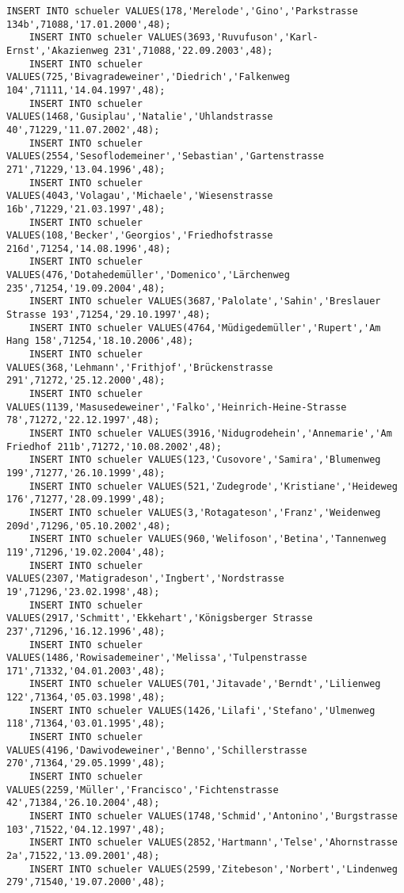 \begin{lstlisting}[breaklines=True, numbers=none, basicstyle=\tiny, keepspaces=false]
	INSERT INTO schueler VALUES(178,'Merelode','Gino','Parkstrasse 134b',71088,'17.01.2000',48);
	INSERT INTO schueler VALUES(3693,'Ruvufuson','Karl-Ernst','Akazienweg 231',71088,'22.09.2003',48);
	INSERT INTO schueler VALUES(725,'Bivagradeweiner','Diedrich','Falkenweg 104',71111,'14.04.1997',48);
	INSERT INTO schueler VALUES(1468,'Gusiplau','Natalie','Uhlandstrasse 40',71229,'11.07.2002',48);
	INSERT INTO schueler VALUES(2554,'Sesoflodemeiner','Sebastian','Gartenstrasse 271',71229,'13.04.1996',48);
	INSERT INTO schueler VALUES(4043,'Volagau','Michaele','Wiesenstrasse 16b',71229,'21.03.1997',48);
	INSERT INTO schueler VALUES(108,'Becker','Georgios','Friedhofstrasse 216d',71254,'14.08.1996',48);
	INSERT INTO schueler VALUES(476,'Dotahedemüller','Domenico','Lärchenweg 235',71254,'19.09.2004',48);
	INSERT INTO schueler VALUES(3687,'Palolate','Sahin','Breslauer Strasse 193',71254,'29.10.1997',48);
	INSERT INTO schueler VALUES(4764,'Müdigedemüller','Rupert','Am Hang 158',71254,'18.10.2006',48);
	INSERT INTO schueler VALUES(368,'Lehmann','Frithjof','Brückenstrasse 291',71272,'25.12.2000',48);
	INSERT INTO schueler VALUES(1139,'Masusedeweiner','Falko','Heinrich-Heine-Strasse 78',71272,'22.12.1997',48);
	INSERT INTO schueler VALUES(3916,'Nidugrodehein','Annemarie','Am Friedhof 211b',71272,'10.08.2002',48);
	INSERT INTO schueler VALUES(123,'Cusovore','Samira','Blumenweg 199',71277,'26.10.1999',48);
	INSERT INTO schueler VALUES(521,'Zudegrode','Kristiane','Heideweg 176',71277,'28.09.1999',48);
	INSERT INTO schueler VALUES(3,'Rotagateson','Franz','Weidenweg 209d',71296,'05.10.2002',48);
	INSERT INTO schueler VALUES(960,'Welifoson','Betina','Tannenweg 119',71296,'19.02.2004',48);
	INSERT INTO schueler VALUES(2307,'Matigradeson','Ingbert','Nordstrasse 19',71296,'23.02.1998',48);
	INSERT INTO schueler VALUES(2917,'Schmitt','Ekkehart','Königsberger Strasse 237',71296,'16.12.1996',48);
	INSERT INTO schueler VALUES(1486,'Rowisademeiner','Melissa','Tulpenstrasse 171',71332,'04.01.2003',48);
	INSERT INTO schueler VALUES(701,'Jitavade','Berndt','Lilienweg 122',71364,'05.03.1998',48);
	INSERT INTO schueler VALUES(1426,'Lilafi','Stefano','Ulmenweg 118',71364,'03.01.1995',48);
	INSERT INTO schueler VALUES(4196,'Dawivodeweiner','Benno','Schillerstrasse 270',71364,'29.05.1999',48);
	INSERT INTO schueler VALUES(2259,'Müller','Francisco','Fichtenstrasse 42',71384,'26.10.2004',48);
	INSERT INTO schueler VALUES(1748,'Schmid','Antonino','Burgstrasse 103',71522,'04.12.1997',48);
	INSERT INTO schueler VALUES(2852,'Hartmann','Telse','Ahornstrasse 2a',71522,'13.09.2001',48);
	INSERT INTO schueler VALUES(2599,'Zitebeson','Norbert','Lindenweg 279',71540,'19.07.2000',48);

\end{lstlisting}
